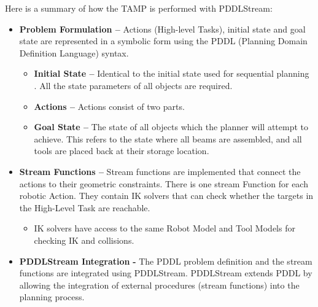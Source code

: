 Here is a summary of how the TAMP is performed with PDDLStream:

\begin{itemize}
	\item \textbf{Problem Formulation --} Actions (High-level Tasks), initial state and goal state are represented in a symbolic form using the PDDL (Planning Domain Definition Language) syntax.

\begin{itemize}
	\item \textbf{Initial State --} Identical to the initial state used for sequential planning . All the state parameters of all objects are required.

	\item \textbf{Actions --} Actions consist of two parts. 

	\item \textbf{Goal State --} The state of all objects which the planner will attempt to achieve. This refers to the state where all beams are assembled, and all tools are placed back at their storage location.

\end{itemize}
	\item \textbf{Stream Functions --} Stream functions are implemented that connect the actions to their geometric constraints. There is one stream Function for each robotic Action. They contain IK solvers that can check whether the targets in the High-Level Task are reachable.

\begin{itemize}
	\item IK solvers have access to the same Robot Model and Tool Models  for checking IK and collisions.

\end{itemize}
	\item \textbf{PDDLStream Integration} \textbf{-} The PDDL problem definition and the stream functions are integrated using PDDLStream. PDDLStream extends PDDL by allowing the integration of external procedures (stream functions) into the planning process.


\end{itemize}

